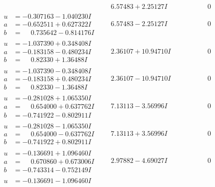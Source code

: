 \documentclass[1p]{elsarticle_modified}
\theoremstyle{definition}
\begin{document}
$$\begin{array}{c|c|c}
 & \phantom{-}6.57483 + 2.25127 I & \phantom{-0.000000 } 0 \\ \hline\begin{aligned}
u &= -0.307163 - 1.040230 I \\
a &= -0.652511 + 0.627322 I \\
b &= \phantom{-}0.735642 - 0.814176 I\end{aligned}
 & \phantom{-}6.57483 - 2.25127 I & \phantom{-0.000000 } 0 \\ \hline\begin{aligned}
u &= -1.037390 + 0.348408 I \\
a &= -0.183158 - 0.480234 I \\
b &= \phantom{-}0.82330 + 1.36488 I\end{aligned}
 & \phantom{-}2.36107 + 10.94710 I & \phantom{-0.000000 } 0 \\ \hline\begin{aligned}
u &= -1.037390 - 0.348408 I \\
a &= -0.183158 + 0.480234 I \\
b &= \phantom{-}0.82330 - 1.36488 I\end{aligned}
 & \phantom{-}2.36107 - 10.94710 I & \phantom{-0.000000 } 0 \\ \hline\begin{aligned}
u &= -0.281028 + 1.065350 I \\
a &= \phantom{-}0.654000 + 0.637762 I \\
b &= -0.741922 - 0.802911 I\end{aligned}
 & \phantom{-}7.13113 - 3.56996 I & \phantom{-0.000000 } 0 \\ \hline\begin{aligned}
u &= -0.281028 - 1.065350 I \\
a &= \phantom{-}0.654000 - 0.637762 I \\
b &= -0.741922 + 0.802911 I\end{aligned}
 & \phantom{-}7.13113 + 3.56996 I & \phantom{-0.000000 } 0 \\ \hline\begin{aligned}
u &= -0.136691 + 1.096460 I \\
a &= \phantom{-}0.670860 + 0.673006 I \\
b &= -0.743314 - 0.752149 I\end{aligned}
 & \phantom{-}2.97882 - 4.69027 I & \phantom{-0.000000 } 0 \\ \hline\begin{aligned}
u &= -0.136691 - 1.096460 I \\

\end{aligned}
\end{array}$$
\end{document}
